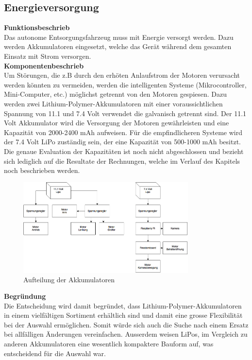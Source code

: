 \subsection{Energieversorgung}

\textbf{Funktionsbeschrieb}\\[0.2cm]
Das autonome Entsorgungsfahrzeug muss mit Energie versorgt werden. Dazu werden Akkumulatoren eingesetzt, welche das Gerät während dem gesamten Einsatz mit Strom versorgen. \\[0.2cm]
\textbf{Komponentenbeschrieb}\\[0.2cm]
Um Störungen, die z.B durch den erhöten Anlaufstrom der Motoren verursacht werden könnten zu vermeiden, werden die intelligenten Systeme (Mikrocontroller, Mini-Computer, etc.) möglichst getrennt von den Motoren gespiesen. Dazu werden zwei Lithium-Polymer-Akkumulatoren mit einer voraussichtlichen Spannung von 11.1 und 7.4 Volt verwendet die galvanisch getrennt sind.
Der 11.1 Volt Akkumulator wird die Versorgung der Motoren gewährleisten und eine Kapazität von 2000-2400 mAh aufweisen. Für die empfindlicheren Systeme wird der 7.4 Volt LiPo zuständig sein, der eine Kapazität von 500-1000 mAh besitzt.
Die genaue Evaluation der Kapazitäten ist noch nicht abgeschlossen und bezieht sich lediglich auf die Resultate der Rechnungen, welche im Verlauf des Kapitels noch beschrieben werden.
\begin{figure}[H]
\centering
\includegraphics[width=0.8\textwidth]{03_Loesungskonzept/pictures/speisung.png}
\caption{Aufteilung der Akkumulatoren}	
\end{figure}\flushleft
\textbf{Begründung}\\[0.2cm]
Die Entscheidung wird damit begründet, dass Lithium-Polymer-Akkumulatoren in einem vielfältigen Sortiment erhältlich sind und damit eine grosse Flexibilität bei der Auswahl ermöglichen. Somit würde sich auch die Suche nach einem Ersatz bei allfälligen Änderungen vereinfachen. Ausserdem weisen LiPos, im Vergleich zu anderen Akkumulatoren eine wesentlich kompaktere Bauform auf, was entscheidend für die Auswahl war. \\[0.2cm]
